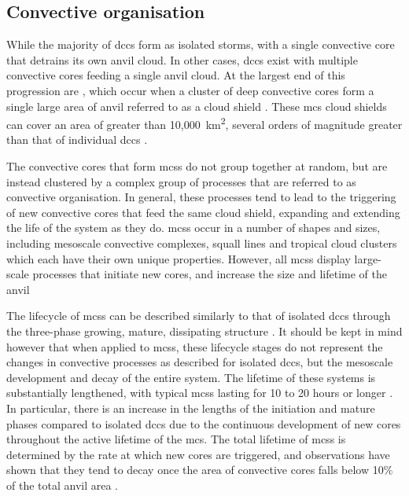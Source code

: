 \subsection{Convective organisation}

While the majority of \acrshort{dcc}s form as isolated storms, with a single convective core that detrains its own anvil cloud.
In other cases, \acrshort{dcc}s exist with multiple convective cores feeding a single anvil cloud.
At the largest end of this progression are , which occur when a cluster of deep convective cores form a single large area of anvil referred to as a cloud shield \citep{roca_simple_2017}.
These \acrshort{mcs} cloud shields can cover an area of greater than 10,000~km\textsuperscript{2}, several orders of magnitude greater than that of individual \acrshort{dcc}s \citep{houze_mesoscale_2004}.

The convective cores that form \acrshort{mcs}s do not group together at random, but are instead clustered by a complex group of processes that are referred to as convective organisation.
In general, these processes tend to lead to the triggering of new convective cores that feed the same cloud shield, expanding and extending the life of the system as they do.
\acrshort{mcs}s occur in a number of shapes and sizes, including mesoscale convective complexes, squall lines and tropical cloud clusters \citep{tsakraklides_global_2003a} which each have their own unique properties.
However, all \acrshort{mcs}s display large-scale processes that initiate new cores, and increase the size and lifetime of the anvil

The lifecycle of \acrshort{mcs}s can be described similarly to that of isolated \acrshort{dcc}s through the three-phase growing, mature, dissipating structure \citep{futyan_deep_2007}.
It should be kept in mind however that when applied to \acrshort{mcs}s, these lifecycle stages do not represent the changes in convective processes as described for isolated \acrshort{dcc}s, but the mesoscale development and decay of the entire system.
The lifetime of these systems is substantially lengthened, with typical \acrshort{mcs}s lasting for 10 to 20 hours or longer \citep{chen_diurnal_1997}.
In particular, there is an increase in the lengths of the initiation and mature phases compared to isolated \acrshort{dcc}s \citep{wall_life_2018} due to the continuous development of new cores throughout the active lifetime of the \acrshort{mcs}.
The total lifetime of \acrshort{mcs}s is determined by the rate at which new cores are triggered, and observations have shown that they tend to decay once the area of convective cores falls below 10\% of the total anvil area \citep{elsaesser_simple_2022}.

